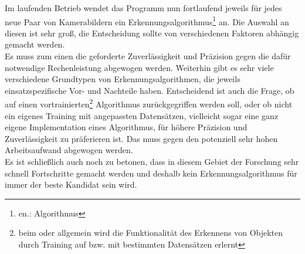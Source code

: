 Im laufenden Betrieb wendet das Programm nun fortlaufend jeweils für jedes neue Paar von Kamerabildern ein Erkennungsalgorithmus\footnote{en.:  Algorithmus} an. Die Auswahl an diesen ist sehr groß, die Entscheidung sollte von verschiedenen Faktoren abhängig gemacht werden.\\
Es muss zum einen die geforderte Zuverlässigkeit und Präzision gegen die dafür notwendige Rechenleistung abgewogen werden. Weiterhin gibt es sehr viele verschiedene Grundtypen von Erkennungsalgorithmen, die jeweils einsatzspezifische Vor- und Nachteile haben. Entscheidend ist auch die Frage, ob auf einen vortrainierten\footnote{beim  oder allgemein  wird die Funktionalität des Erkennens von Objekten durch Training auf bzw. mit bestimmten Datensätzen erlernt} Algorithmus zurückgegriffen werden soll, oder ob nicht ein eigenes Training mit angepassten Datensätzen, vielleicht sogar eine ganz eigene Implementation eines  Algorithmus, für höhere Präzision und Zuverlässigkeit zu präferieren ist. Das muss gegen den potenziell sehr hohen Arbeitsaufwand abgewogen werden.\\
Es ist schließlich auch noch zu betonen, dass in diesem Gebiet der Forschung sehr schnell Fortschritte gemacht werden und deshalb kein Erkennungsalgorithmus für immer der beste Kandidat sein wird.\kleinerabstand




